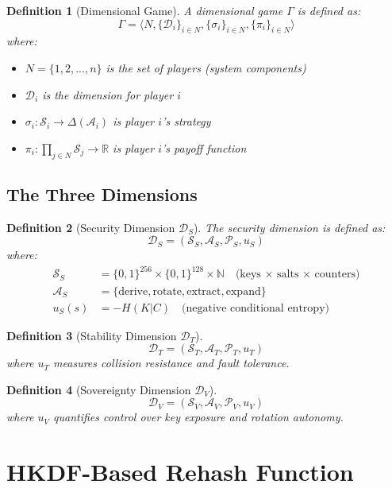\documentclass[11pt]{article}
\newtheorem{definition}{Definition}
\begin{document}
\begin{definition}[Dimensional Game]
A dimensional game $\Gamma$ is defined as:
\[\Gamma = \langle N, \{\mathcal{D}_i\}_{i \in N}, \{\sigma_i\}_{i \in N}, \{\pi_i\}_{i \in N} \rangle\]
where:
\begin{itemize}
    \item $N = \{1, 2, ..., n\}$ is the set of players (system components)
    \item $\mathcal{D}_i$ is the dimension for player $i$
    \item $\sigma_i: \mathcal{S}_i \rightarrow \Delta(\mathcal{A}_i)$ is player $i$'s strategy
    \item $\pi_i: \prod_{j \in N} \mathcal{S}_j \rightarrow \mathbb{R}$ is player $i$'s payoff function
\end{itemize}
\end{definition}

\subsection{The Three Dimensions}

\begin{definition}[Security Dimension $\mathcal{D}_S$]
The security dimension is defined as:
\[\mathcal{D}_S = (\mathcal{S}_S, \mathcal{A}_S, \mathcal{P}_S, u_S)\]
where:
\begin{align}
\mathcal{S}_S &= \{0, 1\}^{256} \times \{0, 1\}^{128} \times \mathbb{N} \quad \text{(keys × salts × counters)}\\
\mathcal{A}_S &= \{\text{derive}, \text{rotate}, \text{extract}, \text{expand}\}\\
u_S(s) &= -H(K|C) \quad \text{(negative conditional entropy)}
\end{align}
\end{definition}

\begin{definition}[Stability Dimension $\mathcal{D}_T$]
\[\mathcal{D}_T = (\mathcal{S}_T, \mathcal{A}_T, \mathcal{P}_T, u_T)\]
where $u_T$ measures collision resistance and fault tolerance.
\end{definition}

\begin{definition}[Sovereignty Dimension $\mathcal{D}_V$]
\[\mathcal{D}_V = (\mathcal{S}_V, \mathcal{A}_V, \mathcal{P}_V, u_V)\]
where $u_V$ quantifies control over key exposure and rotation autonomy.
\end{definition}

\section{HKDF-Based Rehash Function}
\end{document}
